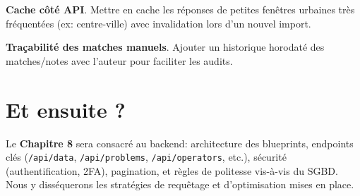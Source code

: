 \textbf{Cache côté API}. Mettre en cache les réponses de petites fenêtres urbaines très fréquentées (ex: centre-ville) avec invalidation lors d'un nouvel import.

\textbf{Traçabilité des matches manuels}. Ajouter un historique horodaté des matches/notes avec l'auteur pour faciliter les audits.

\section*{Et ensuite ?}
Le \textbf{Chapitre 8} sera consacré au backend: architecture des blueprints, endpoints clés (\texttt{/api/data}, \texttt{/api/problems}, \texttt{/api/operators}, etc.), sécurité (authentification, 2FA), pagination, et \og règles de politesse \fg{} vis-à-vis du SGBD. Nous y disséquerons les stratégies de requêtage et d'optimisation mises en place.





